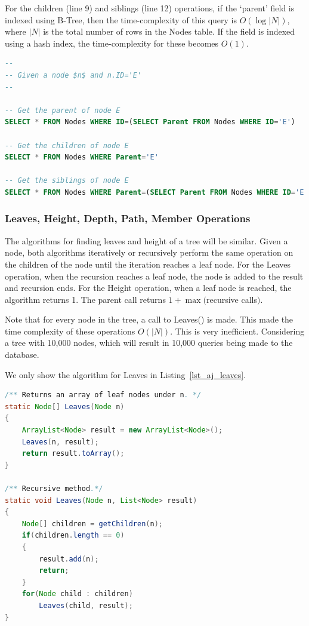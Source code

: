 For the children (line 9) and siblings (line 12) operations, if the `parent' field is indexed using B-Tree\cite{Comer:1979:UB:356770.356776}, then the time-complexity of this query is $O(\log |N|)$, where $|N|$ is the total number of rows in the Nodes table. If the field is indexed using a hash index, the time-complexity for these becomes $O(1)$.

\begin{lstlisting}[language=sql, caption={Parent, Children, and Sibling}, label=lst_aj_parent]
--
-- Given a node $n$ and n.ID='E'
--

-- Get the parent of node E
SELECT * FROM Nodes WHERE ID=(SELECT Parent FROM Nodes WHERE ID='E')

-- Get the children of node E
SELECT * FROM Nodes WHERE Parent='E'

-- Get the siblings of node E
SELECT * FROM Nodes WHERE Parent=(SELECT Parent FROM Nodes WHERE ID='E') AND ID != 'E'

\end{lstlisting}

\subsubsection{Leaves, Height, Depth, Path, Member Operations}\label{sec_al_depth}

The algorithms for finding leaves and height of a tree will be similar. Given a node, both algorithms iteratively or recursively perform the same operation on the children of the node until the iteration reaches a leaf node. For the Leaves operation, when the recursion reaches a leaf node, the node is added to the result and recursion ends. For the Height operation, when a leaf node is reached, the algorithm returns 1. The parent call returns $1 + \max($recursive calls$)$.

Note that for every node in the tree, a call to Leaves() is made. This made the time complexity of these operations $O(|N|)$. This is very inefficient. Considering a tree with 10,000 nodes, which will result in 10,000 queries being made to the database.

We only show the algorithm for Leaves in Listing~\ref{lst_aj_leaves}.

\begin{lstlisting}[language=java, style=java, caption=Leaves, label=lst_aj_leaves]
/** Returns an array of leaf nodes under n. */
static Node[] Leaves(Node n)
{
    ArrayList<Node> result = new ArrayList<Node>();
    Leaves(n, result);
    return result.toArray();
}

/** Recursive method.*/
static void Leaves(Node n, List<Node> result)
{
    Node[] children = getChildren(n);
    if(children.length == 0)
    {
        result.add(n);
        return;
    }
    for(Node child : children)
        Leaves(child, result);
}

\end{lstlisting}

